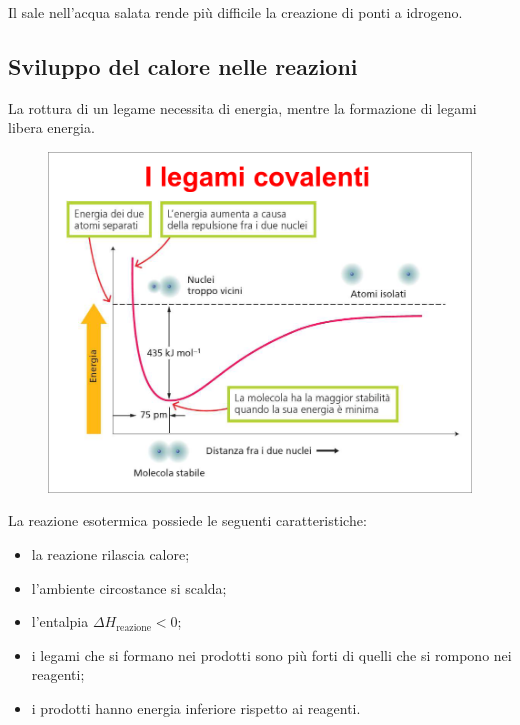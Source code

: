 \documentclass[a4paper]{article}
\begin{document}
Il sale nell'acqua salata rende più difficile la creazione di ponti a idrogeno.


\pagebreak

\subsection{Sviluppo del calore nelle reazioni}

La rottura di un legame necessita di energia, mentre
la formazione di legami libera energia.

\begin{center}
\begin{figure}[h]
    \centering
    \includegraphics[width=\textwidth]{./cov_bond_energy.png}
\end{figure}
\end{center}



La reazione esotermica possiede le seguenti caratteristiche:
\begin{itemize}
    \item la reazione rilascia calore;
    \item l'ambiente circostance si scalda;
    \item l'entalpia \(\Delta H_{\text{reazione}} < 0\);
    \item i legami che si formano nei prodotti sono più forti di quelli che si rompono nei reagenti;
    \item i prodotti hanno energia inferiore rispetto ai reagenti.
\end{itemize}
\end{document}
